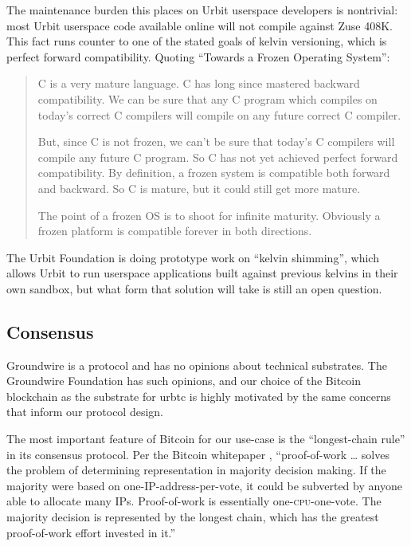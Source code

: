 \documentclass[twoside]{article}
\begin{document}
The maintenance burden this places on Urbit userspace developers is
nontrivial: most Urbit userspace code available online will not compile
against Zuse 408K. This fact runs counter to one of the stated goals of
kelvin versioning, which is perfect forward compatibility. Quoting
``Towards a Frozen Operating System'':

\begin{quote}
C is a very mature language. C has long since mastered
backward compatibility. We can be sure that any C program which compiles
on today's correct C compilers will compile on any future correct C
compiler.

But, since C is not frozen, we can't be sure that today's
C compilers will compile any future C program. So C has not yet achieved
perfect forward compatibility. By definition, a frozen system is
compatible both forward and backward. So C is mature, but it could still
get more mature.

The point of a frozen OS is to shoot for infinite
maturity. Obviously a frozen platform is compatible forever in both
directions.
\end{quote}

The Urbit Foundation is doing prototype work on ``kelvin shimming'',
which allows Urbit to run userspace applications built against previous
kelvins in their own sandbox, but what form that solution will take is
still an open question.

\subsection{Consensus}\label{consensus}

Groundwire is a protocol and has no opinions about technical substrates.
The Groundwire Foundation has such opinions, and our choice of the
Bitcoin blockchain as the substrate for urbtc is highly motivated by the
same concerns that inform our protocol design.

The most important feature of Bitcoin for our use-case is the
``longest-chain rule'' in its consensus protocol. Per the Bitcoin
whitepaper \citep{Nakamoto2008}, ``proof-of-work
\ldots{} solves the problem of determining representation in majority
decision making. If the majority were based on one-IP-address-per-vote,
it could be subverted by anyone able to allocate many IPs. Proof-of-work
is essentially one-\textsc{cpu}-one-vote. The majority decision is represented by
the longest chain, which has the greatest proof-of-work effort invested
in it.''
\end{document}
